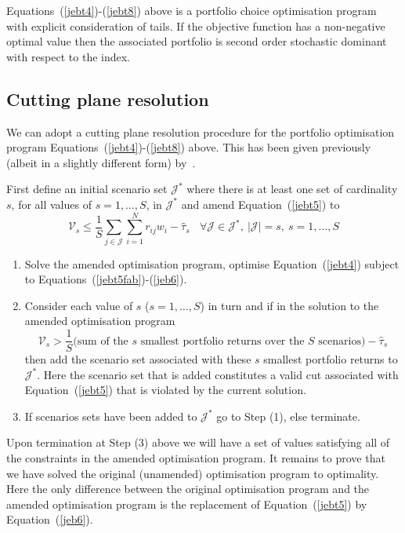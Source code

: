 Equations~(\ref{jebt4})-(\ref{jebt8}) above is a portfolio choice optimisation program with explicit consideration of tails. If the 
objective function has a non-negative optimal value then the associated portfolio  is second order stochastic dominant with respect to the index.


\subsection{Cutting plane resolution}
We can adopt a cutting plane resolution procedure for the portfolio optimisation program Equations~(\ref{jebt4})-(\ref{jebt8}) above.
This has been given previously (albeit in a slightly different form) by~\cite{fabian2011}.

First define an initial scenario set $\mathcal{J^*}$  where there is at least one set of cardinality $s$, for all values of $s=1,\ldots,S$, in $\mathcal{J^*}$ and amend Equation~(\ref{jebt5}) to 
\begin{equation}
\mathcal{V}_s  \leq \frac{1}{S} \sum_{j \in \mathcal{J}} \sum_{i = 1}^N r_{ij} w_i - \hat{\tau}_s~~~~\forall \mathcal{J} \in \mathcal{J^*},~|\mathcal{J}| = s,~s=1,\ldots,S 
\label{jeb6}
\end{equation}
\begin{enumerate}
\item Solve the amended optimisation program, optimise Equation~(\ref{jebt4}) subject to Equations~(\ref{jebt5fab})-(\ref{jeb6}).
\item Consider each value of $s$ ($s=1,\ldots,S$) in turn and if in the solution to the amended optimisation program 
\begin{equation}
 \mathcal{V}_s > \frac{1}{S} \text{(sum of the $s$ smallest portfolio returns over the $S$ scenarios)} -  \hat{\tau}_s
\label{jebt9a}
\end{equation}
then add the scenario set associated with these 
$s$ smallest portfolio returns to $\mathcal{J^*}$. Here the scenario set that is added constitutes a valid cut associated
 with Equation~(\ref{jebt5}) that is violated by the current solution. 
\item If scenarios sets have been added to  $\mathcal{J^*}$ go to Step (1), else terminate.
\end{enumerate}

\noindent Upon
termination at Step (3) above we will have a set of values satisfying all of the 
constraints in the amended optimisation program.
 It remains to prove that we have solved the 
original (unamended) optimisation program to optimality. Here
 the only difference between the original optimisation program and the amended optimisation program 
is the replacement of Equation~(\ref{jebt5}) by Equation~(\ref{jeb6}).

